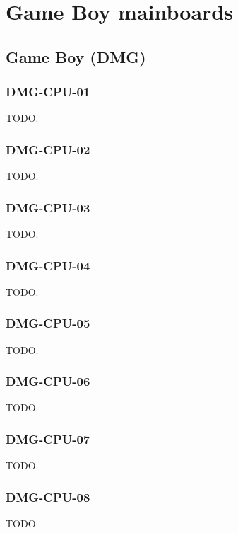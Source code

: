 \chapter{Game Boy mainboards}

\section{Game Boy (DMG)}

\subsection{DMG-CPU-01}

TODO.

\subsection{DMG-CPU-02}

TODO.

\subsection{DMG-CPU-03}

TODO.

\subsection{DMG-CPU-04}

TODO.

\subsection{DMG-CPU-05}

TODO.

\subsection{DMG-CPU-06}

TODO.

\subsection{DMG-CPU-07}

TODO.

\subsection{DMG-CPU-08}

TODO.

